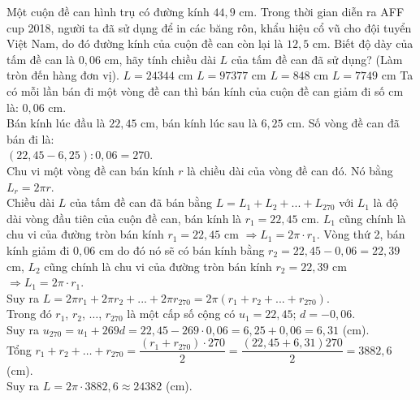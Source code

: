 \begin{ex}%
	Một cuộn đề can hình trụ có đường kính $44,9$ cm. Trong thời gian diễn ra AFF cup 2018, người ta đã sử dụng để in các băng rôn, khẩu hiệu cổ vũ cho đội tuyển Việt Nam, do đó đường kính của cuộn đề can còn lại là $12,5$ cm. Biết độ dày của tấm đề can là $0,06$ cm, hãy tính chiều dài $L$ của tấm đề can đã sử dụng? (Làm tròn đến hàng đơn vị).
	\choice
	{\True $L=24344$ cm}
	{$L=97377$ cm}
	{$L=848$ cm}
	{$L=7749$ cm}
	\loigiai
	{
		Ta có mỗi lần bán đi một vòng đề can thì bán kính của cuộn đề can giảm đi số cm là: $0,06$ cm.\\
		Bán kính lúc đầu là $22,45$ cm, bán kính lúc sau là $6,25$ cm. Số vòng đề can đã bán đi là:\\
		$\left(22,45-6,25\right):0,06=270$.\\
		Chu vi một vòng đề can bán kính $r$ là chiều dài của vòng đề can đó. Nó bằng $L_r=2\pi r$.\\
		Chiều dài $L$ của tấm đề can đã bán bằng $L=L_1+L_2+...+L_{270}$ với $L_1$ là độ dài vòng đầu tiên của cuộn đề can, bán kính là $r_1=22,45$ cm. $L_1$ cũng chính là chu vi của đường tròn bán kính $r_1=22,45$ cm $\Rightarrow L_1=2\pi\cdot r_1$. Vòng thứ 2, bán kính giảm đi $0,06$ cm do đó nó sẽ có bán kính bằng $r_2=22,45-0,06=22,39$ cm, $L_2$ cũng chính là chu vi của đường tròn bán kính $r_2=22,39$ cm $\Rightarrow L_1=2\pi\cdot r_1$.\\
		Suy ra $L=2\pi{r_1}+2\pi{r_2}+...+2\pi{r_{270}}=2\pi\left(r_1+r_2+...+r_{270}\right)$.\\
		Trong đó $r_1$, $r_2$, $\ldots$, $r_{270}$ là một cấp số cộng có $u_1=22,45$; $d=-0,06$.\\
		Suy ra $u_{270}=u_1+269d=22,45-269\cdot 0,06=6,25+0,06=6,31$ (cm).\\
		Tổng $r_1+r_2+\ldots +r_{270}=\dfrac{\left(r_1+r_{270}\right)\cdot 270}{2}=\dfrac{\left(22,45+6,31\right)270}{2}=3882,6$ (cm).\\
		Suy ra $L=2\pi\cdot 3882,6\approx 24382$ (cm).}
\end{ex}

